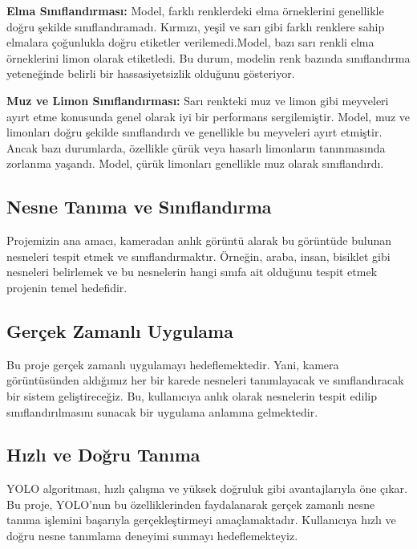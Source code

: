 \documentclass[11pt,a4paper]{report}
\begin{document}
    \textbf{Elma Sınıflandırması:} Model, farklı renklerdeki elma örneklerini genellikle doğru şekilde sınıflandıramadı. Kırmızı, yeşil ve sarı gibi farklı renklere sahip elmalara çoğunlukla doğru etiketler verilemedi.Model, bazı sarı renkli elma örneklerini limon olarak etiketledi. Bu durum, modelin renk bazında sınıflandırma yeteneğinde belirli bir hassasiyetsizlik olduğunu gösteriyor.
    \newline
    
    \textbf{Muz ve Limon Sınıflandırması:} Sarı renkteki muz ve limon gibi meyveleri ayırt etme konusunda genel olarak iyi bir performans sergilemiştir. Model, muz ve limonları doğru şekilde sınıflandırdı ve genellikle bu meyveleri ayırt etmiştir. Ancak bazı durumlarda, özellikle çürük veya hasarlı limonların tanınmasında zorlanma yaşandı. Model, çürük limonları genellikle muz olarak sınıflandırdı.	

		\subsection{Nesne Tanıma ve Sınıflandırma}
	Projemizin ana amacı, kameradan anlık görüntü alarak bu görüntüde bulunan nesneleri tespit etmek ve sınıflandırmaktır. Örneğin, araba, insan, bisiklet gibi nesneleri belirlemek ve bu nesnelerin hangi sınıfa ait olduğunu tespit etmek projenin temel hedefidir.
	\subsection{Gerçek Zamanlı Uygulama} 
	Bu proje gerçek zamanlı uygulamayı hedeflemektedir. Yani, kamera görüntüsünden aldığımız her bir karede nesneleri tanımlayacak ve sınıflandıracak bir sistem geliştireceğiz. Bu, kullanıcıya anlık olarak nesnelerin tespit edilip sınıflandırılmasını sunacak bir uygulama anlamına gelmektedir.
	\subsection{ Hızlı ve Doğru Tanıma}
	YOLO algoritması, hızlı çalışma ve yüksek doğruluk gibi avantajlarıyla öne çıkar. Bu proje, YOLO'nun bu özelliklerinden faydalanarak gerçek zamanlı nesne tanıma işlemini başarıyla gerçekleştirmeyi amaçlamaktadır. Kullanıcıya hızlı ve doğru nesne tanımlama deneyimi sunmayı hedeflemekteyiz.
	\newpage
	
\end{document}

